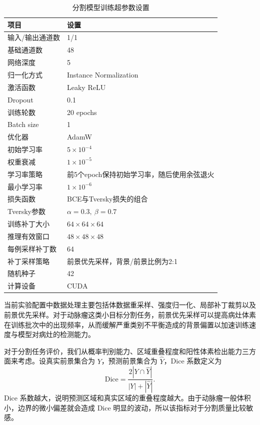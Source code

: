 \begin{table}[!htbp]
\centering
\caption{分割模型训练超参数设置}
\label{tab:seg_hyperparams}
\small
\renewcommand{\arraystretch}{0.88}
\setlength{\tabcolsep}{5pt}
\begin{tabular}{ll}
\toprule
项目 & 设置 \\
\midrule
输入/输出通道数 & 1/1 \\
基础通道数 & 48 \\
网络深度 & 5 \\
归一化方式 & Instance Normalization \\
激活函数 & Leaky ReLU \\
Dropout & 0.1 \\
训练轮数 & 20 epochs \\
Batch size & 1 \\
优化器 & AdamW \\
初始学习率 & $5\times10^{-4}$ \\
权重衰减 & $1\times10^{-5}$ \\
学习率策略 & 前5个epoch保持初始学习率，随后使用余弦退火 \\
最小学习率 & $1\times10^{-6}$ \\
损失函数 & BCE与Tversky损失的组合 \\
Tversky参数 & $\alpha=0.3,\ \beta=0.7$ \\
训练补丁大小 & $64\times64\times64$ \\
推理有效窗口 & $48\times48\times48$ \\
每例采样补丁数 & 64 \\
补丁采样策略 & 前景优先采样，背景/前景比例为2:1 \\
随机种子 & 42 \\
计算设备 & CUDA \\
\bottomrule
\end{tabular}
\normalsize
\renewcommand{\arraystretch}{1}
\end{table}

当前实验配置中数据处理主要包括体数据重采样、强度归一化、局部补丁裁剪以及前景优先采样。对于动脉瘤这类小目标分割任务，前景优先采样可以提高病灶体素在训练批次中的出现频率，从而缓解严重类别不平衡造成的背景偏置以加速训练速度与模型对病灶的检测能力。

对于分割任务评价，我们从概率判别能力、区域重叠程度和阳性体素检出能力三方面来考虑。设真实前景集合为 $Y$，预测前景集合为 $\hat{Y}$，Dice 系数定义为
\begin{equation}
\mathrm{Dice}=\frac{2|Y\cap \hat{Y}|}{|Y|+|\hat{Y}|}.
\label{eq:eval-dice}
\end{equation}
Dice 系数越大，说明预测区域和真实区域的重叠程度越大。由于动脉瘤一般体积小，边界的微小偏差就会造成 Dice 明显的波动，所以该指标对于分割质量比较敏感。


